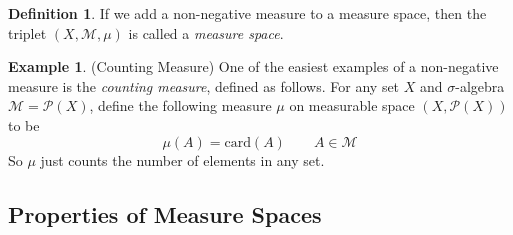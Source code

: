 \documentclass[12pt]{article}
\theoremstyle{plain}
\theoremstyle{definition}
\newtheorem{defn}[thm]{Definition}
\newtheorem{ex}[thm]{Example}
\theoremstyle{remark}
\begin{document}
\begin{defn} 
If we add a non-negative measure to a measure space, then the triplet $(X,\mathscr{M},\mu)$ is called a \emph{measure space}. 
\end{defn}

\begin{ex}
(Counting Measure) One of the easiest examples of a non-negative measure is the \emph{counting measure}, defined as follows. For any set $X$ and $\sigma$-algebra $\mathscr{M} =\mathscr{P}(X)$, define the following measure $\mu$ on measurable space $(X,\mathscr{P}(X))$ to be 
\[
    \mu(A) = \text{card}(A)  \qquad A\in\mathscr{M}
\]
So $\mu$ just counts the number of elements in any set.
\end{ex}

\subsection{Properties of Measure Spaces}
\label{subsec:propmeas}
\end{document}
